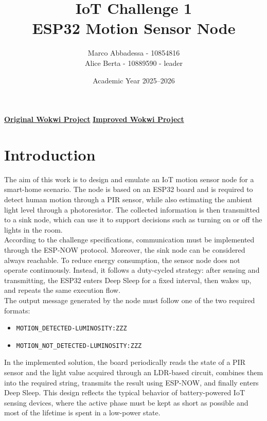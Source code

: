 \documentclass[a4paper,11pt]{article}
\title{
    \vspace{-1cm}
    {\Huge\textcolor{bluepoli}{IoT Challenge 1}}\\[0.4cm]
    {\Large ESP32 Motion Sensor Node}
}
\author{
    Marco Abbadessa - 10854816 \\
    Alice Berta - 10889590 - leader
}
\date{Academic Year 2025--2026}
\begin{document}
\maketitle
\thispagestyle{empty}

\begin{center}
\href{https://wokwi.com/projects/459926821148858369}{\textbf{Original Wokwi Project}}
\hspace{1.5cm}
\href{https://wokwi.com/projects/459925517996162049}{\textbf{Improved Wokwi Project}}
\end{center}

\vspace{0.5cm}
\tableofcontents
\newpage

\section{Introduction}

The aim of this work is to design and emulate an IoT motion sensor node for a
smart-home scenario. The node is based on an ESP32 board and is required to detect
human motion through a PIR sensor, while also estimating the ambient light level
through a photoresistor. The collected information is then transmitted to a sink node,
which can use it to support decisions such as turning on or off the lights in the room.\\

According to the challenge specifications, communication must be implemented through
the ESP-NOW protocol. Moreover, the sink node can be considered always reachable. To
reduce energy consumption, the sensor node does not operate continuously. Instead, it
follows a duty-cycled strategy: after sensing and transmitting, the ESP32 enters Deep
Sleep for a fixed interval, then wakes up, and repeats the same execution flow.\\

The output message generated by the node must follow one of the two required formats:
\begin{itemize}
    \item \texttt{MOTION\_DETECTED-LUMINOSITY:ZZZ}
    \item \texttt{MOTION\_NOT\_DETECTED-LUMINOSITY:ZZZ}
\end{itemize}

In the implemented solution, the board periodically reads the state of a PIR sensor
and the light value acquired through an LDR-based circuit, combines them into the
required string, transmits the result using ESP-NOW, and finally enters Deep Sleep.
This design reflects the typical behavior of battery-powered IoT sensing devices,
where the active phase must be kept as short as possible and most of the lifetime is
spent in a low-power state.
\end{document}
